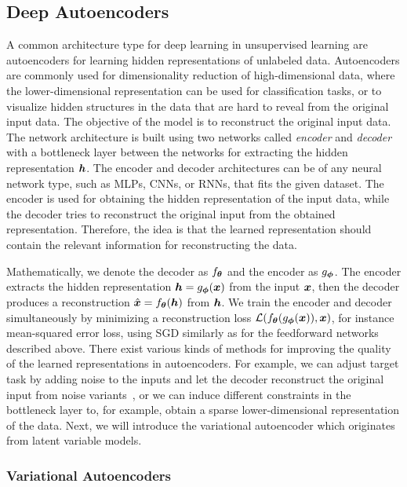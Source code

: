 \subsection{Deep Autoencoders}\label{sec:deep_autoencoders}


A common architecture type for deep learning in unsupervised learning are autoencoders for learning hidden representations of unlabeled data. Autoencoders are commonly used for dimensionality reduction of high-dimensional data, where the lower-dimensional representation can be used for classification tasks, or to visualize hidden structures in the data that are hard to reveal from the original input data. The objective of the model is to reconstruct the original input data. The network architecture is built using two networks called \textit{encoder} and \textit{decoder} with a bottleneck layer between the networks for extracting the hidden representation ${\bm{h}}$. The encoder and decoder architectures can be of any neural network type, such as MLPs, CNNs, or RNNs, that fits the given dataset. The encoder is used for obtaining the hidden representation of the input data, while the decoder tries to reconstruct the original input from the obtained representation. Therefore, the idea is that the learned representation should contain the relevant information for reconstructing the data. 

Mathematically, we denote the decoder as $f_{{\bm{\theta}}}$ and the encoder as $g_{{\bm{\phi}}}$. The encoder extracts the hidden representation ${\bm{h}} = g_{{\bm{\phi}}}({\bm{x}})$ from the input ${\bm{x}}$, then the decoder produces a reconstruction $\hat{{\bm{x}}} = f_{{\bm{\theta}}}({\bm{h}})$ from ${\bm{h}}$. We train the encoder and decoder simultaneously by minimizing a reconstruction loss ${\mathcal{L}}(f_{{\bm{\theta}}}(g_{{\bm{\phi}}}({\bm{x}})), {\bm{x}})$, for instance mean-squared error loss, using SGD similarly as for the feedforward networks described above. There exist various kinds of methods for improving the quality of the learned representations in autoencoders. For example, we can adjust target task by adding noise to the inputs and let the decoder reconstruct the original input from noise variants~\cite{vincent2008extracting}, or we can induce different constraints in the bottleneck layer to, for example, obtain a sparse lower-dimensional representation of the data. Next, we will introduce the variational autoencoder which originates from latent variable models. 

\subsubsection{Variational Autoencoders}\label{sec:variational_autoencoders}

